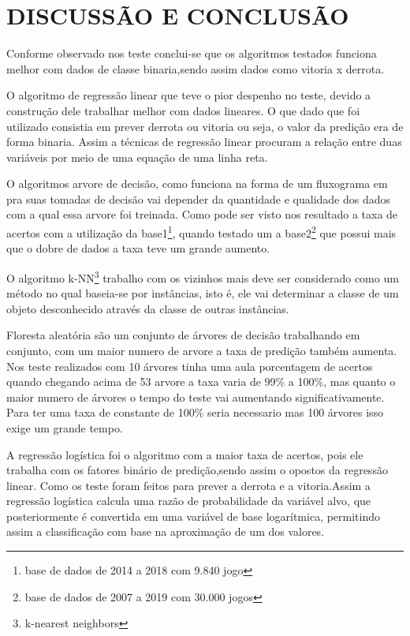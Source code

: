 \newpage
\section{DISCUSSÃO E CONCLUSÃO} 
Conforme observado nos teste conclui-se que os algoritmos testados funciona melhor com dados de classe binaria,sendo assim dados como vitoria x derrota. 

O algoritmo de regressão linear que teve o pior despenho no teste, devido a construção dele trabalhar melhor com dados lineares. O que dado que foi utilizado consistia em prever derrota ou vitoria ou seja, o valor da predição era de forma binaria. Assim a técnicas de regressão linear procuram a relação entre duas variáveis por meio de uma equação de uma linha reta.

O algoritmos arvore de decisão, como funciona na forma de um fluxograma em pra suas tomadas de decisão vai depender da quantidade e qualidade dos dados com a qual essa arvore foi treinada. Como pode ser visto nos resultado a taxa de acertos com a utilização da base1\footnote[4]{base de dados de 2014 a 2018 com 9.840 jogo}, quando testado um a base2\footnote[5]{base de dados de 2007 a 2019 com 30.000 jogos} que possui mais que o dobre de dados a taxa teve um grande aumento.

O algoritmo k-NN\footnote[3]{k-nearest neighbors} trabalho com os vizinhos mais deve ser considerado como um método
no qual baseia-se por instâncias, isto é, ele vai determinar a classe de um objeto
desconhecido através da classe de outras instâncias.

Floresta aleatória são um conjunto de árvores de decisão trabalhando em conjunto, com um maior numero de arvore a taxa de predição também aumenta. Nos teste realizados com 10 árvores tinha uma aula porcentagem de acertos quando chegando acima de 53 arvore a taxa varia de 99\% a 100\%, mas quanto o maior numero de árvores o tempo do teste vai aumentando significativamente. Para ter uma taxa de constante de 100\% seria necessario mas 100 árvores isso exige um grande tempo.

A regressão logística foi o algoritmo com a maior taxa de acertos, pois ele trabalha com os fatores binário de predição,sendo assim o opostos da regressão linear. Como os teste foram feitos para prever a derrota e a vitoria.Assim a regressão logística calcula uma razão de probabilidade da variável alvo, que posteriormente é convertida em uma variável de base logarítmica, permitindo assim a classificação com base na aproximação de um dos valores. 

